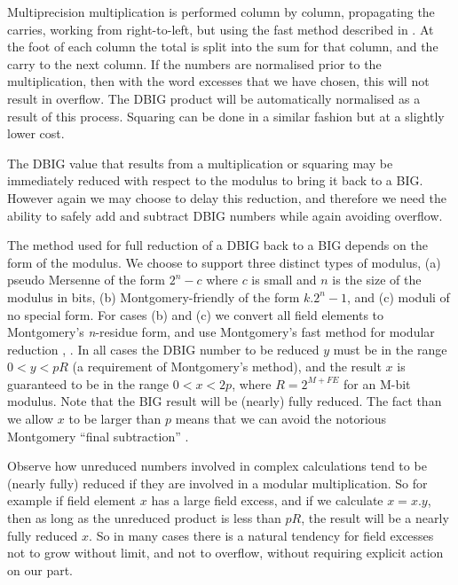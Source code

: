 \documentclass{llncs}
\begin{document}
Multiprecision multiplication is performed column by column, propagating the carries, working from right-to-left, but using the fast method described in \cite{scott2}.
At the foot of each column the total is split into the sum for that column, and the carry to the next column. If the numbers are normalised 
prior to the multiplication, then 
with the word excesses that we have chosen, this will not result in overflow. The {DBIG} product will be automatically normalised as a result of this process. Squaring can be done in a 
similar fashion but at a slightly lower cost. 

The {DBIG} value that results from a multiplication or squaring may be immediately reduced with respect to the modulus to bring it back to a {BIG}. However again we may choose to delay this 
reduction, and therefore we need the ability to safely add and subtract DBIG numbers while again avoiding overflow.

The method used for full reduction of a DBIG back to a BIG depends on the form of the modulus. We choose to support three distinct types of modulus, (a) pseudo Mersenne of the form $2^n-c$ where 
$c$ is small and $n$ is the size of the modulus in bits, 
(b) Montgomery-friendly of the form $k.2^n-1$, and (c) moduli of no special form. For cases (b) and (c) we convert all 
field elements to Montgomery's {\it n}-residue form, and use Montgomery's fast method for modular reduction \cite{montgomery}, \cite{scott2}. In all cases the DBIG number to be reduced $y$ must be in the 
range $0<y<pR$ (a requirement of Montgomery's method), and the result $x$ is guaranteed to 
be in the range $0<x<2p$, where $R=2^{M+FE}$ for an M-bit modulus. Note that the BIG result will be (nearly) fully reduced. The fact than we allow $x$ to be larger than $p$ means that we can avoid
the notorious Montgomery ``final subtraction'' \cite{montgomery}.

Observe how unreduced numbers involved in complex calculations tend to be (nearly fully) reduced if they are involved in a modular multiplication. So for example if field element $x$ has a large field excess,
and if we calculate $x=x.y$, then as long as the unreduced product is less than $pR$, the result will be a nearly fully reduced $x$. So in many cases there is a natural tendency for field excesses 
not to grow without limit, and not to overflow, without requiring explicit action on our part.
\end{document}
